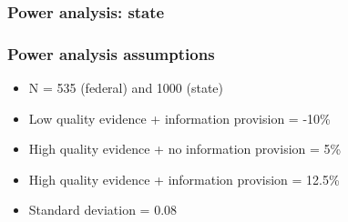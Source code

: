 \documentclass[usenames,dvipsnames]{beamer}
\begin{document}

\begin{frame}
\frametitle{Power analysis: state}


\end{frame}


\begin{frame}
\frametitle{Power analysis assumptions}

\begin{itemize}
\item N = 535 (federal) and 1000 (state)
\item Low quality evidence + information provision = -10\%
\item High quality evidence + no information provision = 5\%
\item High quality evidence + information provision = 12.5\%
\item Standard deviation = 0.08
\end{itemize}

\end{frame}
\end{document}
